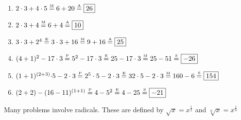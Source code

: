 \documentclass[crop=false,class=book,oneside]{standalone}
\begin{document}
            \begin{example}
                \
                \begin{enumerate}
                    \item ${2}\cdot{3}+{4}\cdot{5}%
                           \overset{\textrm{\tiny{M}}}{=}%
                           6+20\overset{\textrm{\tiny{A}}}{=}%
                           \boxed{26}$
                    \item ${2}\cdot{3}%
                           +4\overset{\textrm{\tiny{M}}}{=}%
                           6+4\overset{\textrm{\tiny{A}}}{=}%
                           \boxed{10}$
                    \item ${3}\cdot{3+2^{4}}%
                           \overset{\textrm{\tiny{E}}}{=}%
                           {3}\cdot {3}+16%
                           \overset{\textrm{\tiny{M}}}{=}%
                           9+16\overset{\textrm{\tiny{A}}}{=}%
                           \boxed{25}$
                    \item $(4+1)^2-17\cdot 3%
                        \overset{\textrm{\tiny{P}}}{=}%
                        5^{2}-17\cdot 3%
                        \overset{\textrm{\tiny{E}}}{=}25-17\cdot 3%
                        \overset{\textrm{\tiny{M}}}{=}25-51%
                        \overset{\textrm{\tiny{S}}}{=}\boxed{-26}$
                    \item ${(1+1)^{(2+3)}\cdot}{5}-%
                           {2}\cdot{3}
                           \overset{\textrm{\tiny{P}}}{=}%
                           {2^{5}}\cdot{5}-{2}\cdot{3}%
                           \overset{\textrm{\tiny{E}}}{=}%
                           {32}\cdot{5}-{2}\cdot{3}%
                           \overset{\textrm{\tiny{M}}}{=}%
                           160-6\overset{\textrm{\tiny{S}}}{=}%
                           \boxed{154}$
                    \item $(2+2)-(16-11)^{(1+1)}%
                           \overset{\textrm{\tiny{P}}}{=}4-5^{2}%
                           \overset{\textrm{\tiny{E}}}{=}4-25%
                           \overset{\textrm{\tiny{S}}}{=}%
                           \boxed{-21}$
                \end{enumerate}
            \end{example}
            \begin{remark}
                \label{remark:North_Shore_Radicals_Def}
                Many problems involve radicals.
                These are defined by
                $\sqrt{x}=x^{\frac{1}{2}}$ and
                $\sqrt[n]{x}=x^{\frac{1}{n}}$
            \end{remark}
\end{document}
